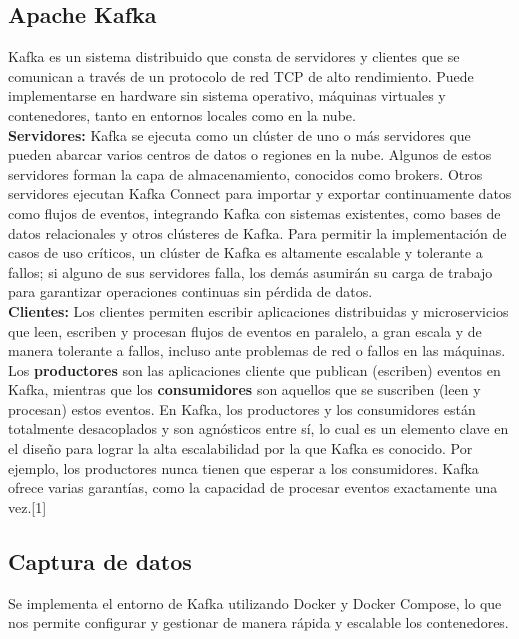\documentclass{article}
\begin{document}
	\subsection{Apache Kafka}
	\begin{flushleft}
		Kafka es un sistema distribuido que consta de servidores y clientes que se comunican a través de un protocolo de red TCP de alto rendimiento. Puede implementarse en hardware sin sistema operativo, máquinas virtuales y contenedores, tanto en entornos locales como en la nube.\\
		\vspace{0.5cm}
		\textbf{Servidores:}  Kafka se ejecuta como un clúster de uno o más servidores que pueden abarcar varios centros de datos o regiones en la nube. Algunos de estos servidores forman la capa de almacenamiento, conocidos como brokers. Otros servidores ejecutan Kafka Connect para importar y exportar continuamente datos como flujos de eventos, integrando Kafka con sistemas existentes, como bases de datos relacionales y otros clústeres de Kafka. Para permitir la implementación de casos de uso críticos, un clúster de Kafka es altamente escalable y tolerante a fallos; si alguno de sus servidores falla, los demás asumirán su carga de trabajo para garantizar operaciones continuas sin pérdida de datos.\\
		\vspace{0.5cm}
		\textbf{Clientes:} Los clientes permiten escribir aplicaciones distribuidas y microservicios que leen, escriben y procesan flujos de eventos en paralelo, a gran escala y de manera tolerante a fallos, incluso ante problemas de red o fallos en las máquinas.\\
		\vspace{0.5cm}
		Los \textbf{productores} son las aplicaciones cliente que publican (escriben) eventos en Kafka, mientras que los \textbf{consumidores} son aquellos que se suscriben (leen y procesan) estos eventos. En Kafka, los productores y los consumidores están totalmente desacoplados y son agnósticos entre sí, lo cual es un elemento clave en el diseño para lograr la alta escalabilidad por la que Kafka es conocido. Por ejemplo, los productores nunca tienen que esperar a los consumidores. Kafka ofrece varias garantías, como la capacidad de procesar eventos exactamente una vez.[1]
	\end{flushleft}
	\subsection{Captura de datos}
	Se implementa el entorno de Kafka utilizando Docker y Docker Compose, lo que nos permite configurar y gestionar de manera rápida y escalable los contenedores.\\
	
\end{document}
